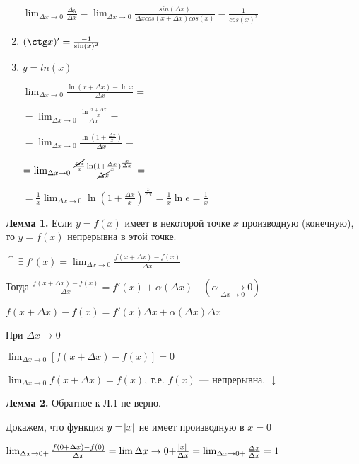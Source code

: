 \documentclass{article}
\begin{document}
\begin{enumerate}
            \( \lim_{\Delta x \to 0} \frac{\Delta y}{\Delta x} = \lim_{\Delta x \to 0} \frac{sin(\Delta x)}{\Delta x cos(x + \Delta x)cos(x)} = \frac{1}{cos(x)^2} \)
        
        \item \((\ctg x)' = \frac{-1}{\sin(x)^2}\)
        \item \(y = ln(x)\)

            \(\lim_{\Delta x \to 0}{\frac{\ln(x+\Delta x) - \ln x}{\Delta x}} =\)

            \(= \lim_{\Delta x \to 0}{\frac{\ln\frac{x + \Delta x}{x}}{\Delta x}} =\)

            \(= \lim_{\Delta x \to 0}{\frac{\ln(1+\frac{\Delta x}{x})}{\Delta x}} =\)

            \(= \lim_{\Delta x \to 0}{\frac{\frac{\cancel{\Delta x}}{x}\ln(1+\frac{\Delta x}{x})^\frac{x}{\Delta x}}{\cancel{\Delta x}}} =\)
            
            \(= \frac{1}{x}\lim_{\Delta x \to 0}{\ln(1 + \frac{\Delta x}{x})^\frac{x}{\Delta x}} = \frac{1}{x}\ln e = \frac{1}{x}\)
        
    \end{enumerate}

    \textbf{Лемма 1.} Если \(y = f(x)\) имеет в некоторой точке \(x\) производную (конечную), то \( y = f(x) \) непрерывна в этой точке.

    \( \uparrow\ \exists\ f'(x) = \lim_{\Delta x \to 0} \frac{f(x + \Delta x) - f(x)}{\Delta x} \) 

    Тогда \( \frac{f(x + \Delta x) - f(x)}{\Delta x} = f'(x) + \alpha(\Delta x)\quad (\alpha \xrightarrow[\Delta x \to 0]{} 0) \)

    \( f(x + \Delta x) - f(x) = f'(x)\Delta x + \alpha(\Delta x)\Delta x \)

    При \( \Delta x \to 0 \)

    \( \lim_{\Delta x \to 0} [f(x + \Delta x) - f(x)] = 0 \)

    \( \lim_{\Delta x \to 0} f(x + \Delta x) = f(x) \), т.е. \( f(x) \) --- непрерывна. \( \downarrow \)

    \textbf{Лемма 2.} Обратное к Л.1 не верно. 
    
    Докажем, что функция \( y = \abs{x} \) не имеет производную в \( x = 0 \)

    \( \lim_{\Delta x \to 0+} \frac{f(0 + \Delta x) - f(0)}{\Delta x} = \lim{\Delta x \to 0+} \frac{\abs{x}}{\Delta x} = \lim_{\Delta x \to 0+} \frac{\Delta x}{\Delta x} = 1 \)
\end{document}
